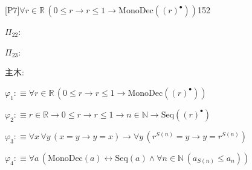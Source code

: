 \begin{fullproof}{[P7]}{$\forall r \in \mathbb{R}\,(0 \leq r \to r \leq 1 \to \mathrm{MonoDec}({(r)^{\bullet}}))$}{152}
\begin{ptree}
\end{ptree}
\noindent$\Pi_{22}$:
\begin{ptree}
\end{ptree}
\noindent$\Pi_{23}$:
\begin{ptree}
\noLine
{}
\end{ptree}
\noindent 主木:
\begin{ptree}
\noLine
{}
\noLine
{}
\end{ptree}
\begin{abbrevlist}
\item $\varphi_{1} :\equiv \forall r \in \mathbb{R}\,(0 \leq r \to r \leq 1 \to \mathrm{MonoDec}({(r)^{\bullet}}))$
\item $\varphi_{2} :\equiv r \in \mathbb{R} \to 0 \leq r \to r \leq 1 \to n \in \mathbb{N} \to \mathrm{Seq}({(r)^{\bullet}})$
\item $\varphi_{3} :\equiv \forall x\,\forall y\,(x = y \to y = x) \to \forall y\,({{r}^{S(n)}} = y \to y = {{r}^{S(n)}})$
\item $\varphi_{4} :\equiv \forall a\,(\mathrm{MonoDec}(a) \leftrightarrow \mathrm{Seq}(a) \land \forall n \in \mathbb{N}\,(a_{S(n)} \leq a_{n}))$

\end{abbrevlist}
\end{fullproof}
